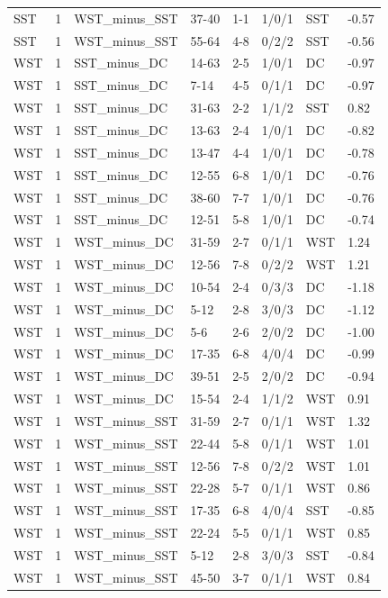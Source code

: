 \begin{table}[!h]
\begin{tabular}[t]{lrllllll}
SST & 1 & WST_minus_SST & 37-40 & 1-1 & 1/0/1 & SST & -0.57\\
SST & 1 & WST_minus_SST & 55-64 & 4-8 & 0/2/2 & SST & -0.56\\
WST & 1 & SST_minus_DC & 14-63 & 2-5 & 1/0/1 & DC & -0.97\\
\addlinespace
WST & 1 & SST_minus_DC & 7-14 & 4-5 & 0/1/1 & DC & -0.97\\
WST & 1 & SST_minus_DC & 31-63 & 2-2 & 1/1/2 & SST & 0.82\\
WST & 1 & SST_minus_DC & 13-63 & 2-4 & 1/0/1 & DC & -0.82\\
WST & 1 & SST_minus_DC & 13-47 & 4-4 & 1/0/1 & DC & -0.78\\
WST & 1 & SST_minus_DC & 12-55 & 6-8 & 1/0/1 & DC & -0.76\\
\addlinespace
WST & 1 & SST_minus_DC & 38-60 & 7-7 & 1/0/1 & DC & -0.76\\
WST & 1 & SST_minus_DC & 12-51 & 5-8 & 1/0/1 & DC & -0.74\\
WST & 1 & WST_minus_DC & 31-59 & 2-7 & 0/1/1 & WST & 1.24\\
WST & 1 & WST_minus_DC & 12-56 & 7-8 & 0/2/2 & WST & 1.21\\
WST & 1 & WST_minus_DC & 10-54 & 2-4 & 0/3/3 & DC & -1.18\\
\addlinespace
WST & 1 & WST_minus_DC & 5-12 & 2-8 & 3/0/3 & DC & -1.12\\
WST & 1 & WST_minus_DC & 5-6 & 2-6 & 2/0/2 & DC & -1.00\\
WST & 1 & WST_minus_DC & 17-35 & 6-8 & 4/0/4 & DC & -0.99\\
WST & 1 & WST_minus_DC & 39-51 & 2-5 & 2/0/2 & DC & -0.94\\
WST & 1 & WST_minus_DC & 15-54 & 2-4 & 1/1/2 & WST & 0.91\\
\addlinespace
WST & 1 & WST_minus_SST & 31-59 & 2-7 & 0/1/1 & WST & 1.32\\
WST & 1 & WST_minus_SST & 22-44 & 5-8 & 0/1/1 & WST & 1.01\\
WST & 1 & WST_minus_SST & 12-56 & 7-8 & 0/2/2 & WST & 1.01\\
WST & 1 & WST_minus_SST & 22-28 & 5-7 & 0/1/1 & WST & 0.86\\
WST & 1 & WST_minus_SST & 17-35 & 6-8 & 4/0/4 & SST & -0.85\\
\addlinespace
WST & 1 & WST_minus_SST & 22-24 & 5-5 & 0/1/1 & WST & 0.85\\
WST & 1 & WST_minus_SST & 5-12 & 2-8 & 3/0/3 & SST & -0.84\\
WST & 1 & WST_minus_SST & 45-50 & 3-7 & 0/1/1 & WST & 0.84\\
\bottomrule
\end{tabular}
\end{table}
